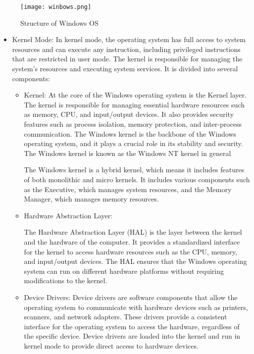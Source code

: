 \documentclass[conference]{IEEEtran}
\begin{document}
\begin{figure}[htbp]
\centerline{\texttt{[image: winbows.png]}}
\caption{Structure of Windows OS}
\label{fig3}
\end{figure}

\begin{itemize}
    \item Kernel Mode: In kernel mode, the operating system has full access to system resources and can execute any instruction, including privileged instructions that are restricted in user mode. The kernel is responsible for managing the system's resources and executing system services. It is divided into several components:
     \begin{itemize}
    
         \item Kernel: At the core of the Windows operating system is the Kernel layer. The kernel is responsible for managing essential hardware resources such as memory, CPU, and input/output devices. It also provides security features such as process isolation, memory protection, and inter-process communication. The Windows kernel is the backbone of the Windows operating system, and it plays a crucial role in its stability and security. The Windows kernel is known as the Windows NT kernel in general

        The Windows kernel is a hybrid kernel, which means it includes features of both monolithic and micro kernels. It includes various components such as the Executive, which manages system resources, and the Memory Manager, which manages memory resources.
        \linebreak
        \item Hardware Abstraction Layer:

        The Hardware Abstraction Layer (HAL) is the layer between the kernel and the hardware of the computer. It provides a standardized interface for the kernel to access hardware resources such as the CPU, memory, and input/output devices. The HAL ensures that the Windows operating system can run on different hardware platforms without requiring modifications to the kernel.
        \linebreak
        \item Device Drivers:
        Device drivers are software components that allow the operating system to communicate with hardware devices such as printers, scanners, and network adapters. These drivers provide a consistent interface for the operating system to access the hardware, regardless of the specific device. Device drivers are loaded into the kernel and run in kernel mode to provide direct access to hardware devices.
     \end{itemize}
    

\end{itemize}
\end{document}
